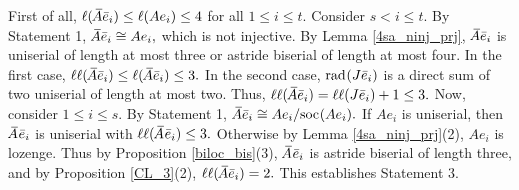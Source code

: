 \documentclass[10pt]{amsart}
\theoremstyle{definition}
\newcommand{\rad}{{\rm rad}\hspace{.5pt}}
\newcommand{\soc}{{\rm soc}\hspace{.5pt}}
\newcommand{\vp}{\vspace{.5pt}}
\begin{document}
\vspace{1pt}

First of all, $\ell(\hspace{2pt}\overline{\hspace{-2.8pt}A} \bar e_i)\le \ell (Ae_i) \le 4$ for all $1\le i\le t.$ Consider $s<i\le t.$ By Statement 1, $\hspace{2pt}\overline{\hspace{-2.8pt}A} \bar e_i\cong Ae_i,$ which is not injective. By Lemma \ref{4sa_ninj_prj}, $\hspace{2pt}\overline{\hspace{-2.8pt}A} \bar e_i$ is uniserial of length at most three or astride biserial of length at most four. In the first case,  $\ell\ell(\hspace{2pt}\overline{\hspace{-2.8pt}A} \bar e_i) \le \ell(\hspace{2pt}\overline{\hspace{-2.8pt}A} \bar e_i)\le 3.$ In the second case, $\rad (J \bar e_i)$ is a direct sum of two uniserial of length at most two. Thus, 
$\ell\ell(\hspace{2pt}\overline{\hspace{-2.8pt}A} \bar e_i)= \ell\ell(J\bar e_i)+1 \le 3.$
Now, consider $1\le i\le s$. \vp By Statement 1, $\hspace{2pt}\overline{\hspace{-2.8pt}A} \bar e_i\cong Ae_i/\soc(Ae_i).$ %
If $Ae_i$ is uniserial, then $\hspace{2pt}\overline{\hspace{-2.8pt}A} \hspace{.5pt} \bar e_i$ is uniserial with $\ell\ell(\hspace{2pt}\overline{\hspace{-2.8pt}A} \hspace{.5pt} \bar e_i)\le 3.$ Otherwise by Lemma \ref{4sa_ninj_prj}(2), $Ae_i$ is lozenge. Thus by Proposition \ref{biloc_bis}(3), $\hspace{2pt}\overline{\hspace{-2.8pt}A} \hspace{.5pt} \bar e_i$ is astride biserial of length three, and by Proposition \ref{CL_3}(2),  $\ell\ell(\hspace{2pt}\overline{\hspace{-2.8pt}A} \bar e_i)=2.$ This establishes Statement 3. 

\end{document}

